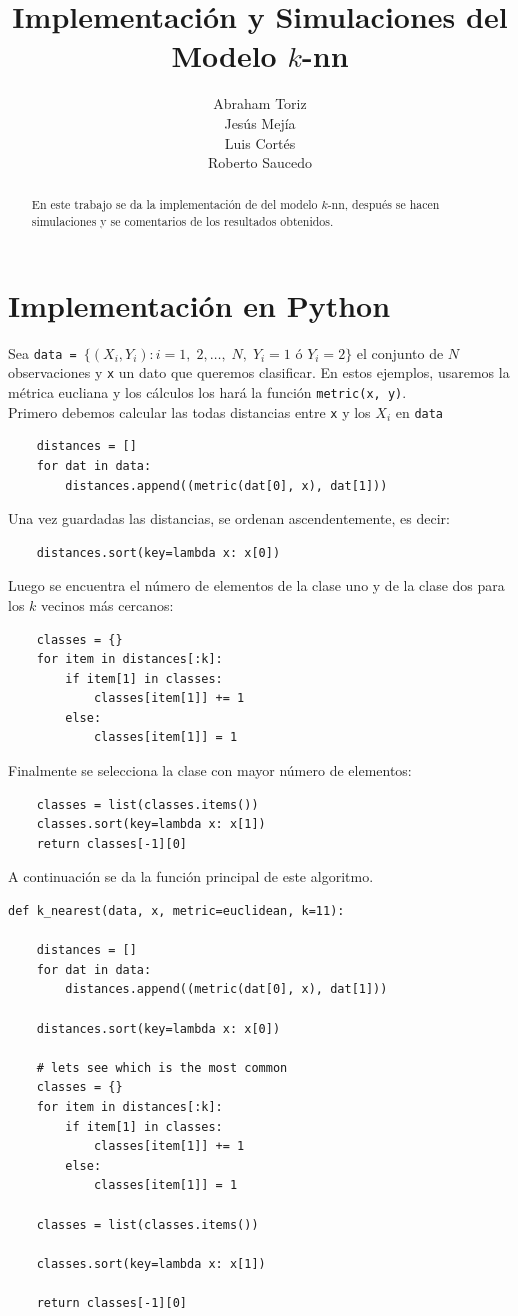 \documentclass[11pt,letterpaper,reqno]{article}
\title{Implementación y Simulaciones del Modelo $k$-nn}
\author{Abraham Toriz\\ Jesús Mejía\\ Luis Cortés\\ Roberto Saucedo}
\begin{document}
\maketitle
\begin{abstract}
En este trabajo se da la implementación  de del modelo $k$-nn, después se hacen simulaciones y se comentarios de los resultados obtenidos.
\end{abstract}

\section{Implementación en Python}
Sea \verb|data = |$\{(X_i, Y_i): i=1,\;2,\ldots,\;N,\; Y_i=1 \text{ ó } Y_i=2\}$ el conjunto de $N$ observaciones y \verb|x| un dato que queremos clasificar. En estos ejemplos, usaremos la métrica eucliana y los cálculos los hará la función \verb|metric(x, y)|.\\

Primero debemos calcular las todas distancias entre \verb|x| y los $X_i$ en \verb|data|
\begin{verbatim}
    distances = []
    for dat in data:
        distances.append((metric(dat[0], x), dat[1]))
\end{verbatim}

Una vez guardadas las distancias, se ordenan ascendentemente, es decir:
\begin{verbatim}
    distances.sort(key=lambda x: x[0])
\end{verbatim}
Luego se encuentra el número de elementos de la clase uno y de la clase dos para los $k$ vecinos más cercanos:
\begin{verbatim}
    classes = {}
    for item in distances[:k]:
        if item[1] in classes:
            classes[item[1]] += 1
        else:
            classes[item[1]] = 1
\end{verbatim}
Finalmente se selecciona la clase con mayor número de elementos:
\begin{verbatim}
    classes = list(classes.items())
    classes.sort(key=lambda x: x[1])
    return classes[-1][0]
\end{verbatim}

A continuación se da la función principal de este algoritmo.
\begin{verbatim}
def k_nearest(data, x, metric=euclidean, k=11):

    distances = []
    for dat in data:
        distances.append((metric(dat[0], x), dat[1]))

    distances.sort(key=lambda x: x[0])

    # lets see which is the most common
    classes = {}
    for item in distances[:k]:
        if item[1] in classes:
            classes[item[1]] += 1
        else:
            classes[item[1]] = 1

    classes = list(classes.items())

    classes.sort(key=lambda x: x[1])

    return classes[-1][0]
\end{verbatim}
\end{document}
